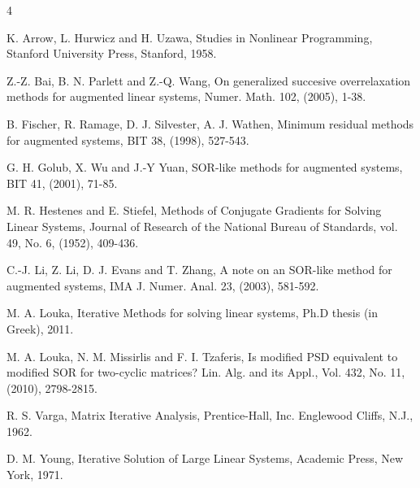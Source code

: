 \documentclass{report}
\begin{document}
\begin{thebibliography}{4}

 K. Arrow, L. Hurwicz and H. Uzawa, Studies in
Nonlinear Programming, Stanford University Press, Stanford, 1958.

 Z.-Z. Bai, B. N. Parlett and Z.-Q. Wang, On
generalized succesive overrelaxation methods for augmented linear
systems, Numer. Math. 102, (2005), 1-38.




 B. Fischer, R. Ramage, D. J. Silvester, A. J.
Wathen, Minimum residual methods for augmented systems, BIT 38, (1998),
527-543.


 G. H. Golub, X. Wu and J.-Y Yuan, SOR-like
methods for augmented systems, BIT 41, (2001), 71-85.


 M. R. Hestenes and E. Stiefel, Methods of Conjugate
Gradients for Solving Linear Systems, Journal of Research of the National
Bureau of Standards, vol. 49, No. 6, (1952), 409-436.


 C.-J. Li, Z. Li, D. J. Evans and T. Zhang, A
note on an SOR-like method for augmented
systems, IMA J. Numer. Anal. 23, (2003), 581-592.

 M. A. Louka, Iterative Methods for solving linear
systems, Ph.D thesis (in Greek), 2011.

 M. A. Louka, N. M. Missirlis and F. I. Tzaferis, Is
modified PSD equivalent to modified SOR for two-cyclic matrices? Lin.
Alg. and its Appl., Vol. 432, No. 11, (2010), 2798-2815.


 R. S. Varga, Matrix Iterative Analysis, Prentice-Hall, Inc.
Englewood Cliffs, N.J., 1962.





 D. M. Young, Iterative Solution of Large Linear Systems,
Academic Press, New York, 1971.

\end{thebibliography}
\end{document}
